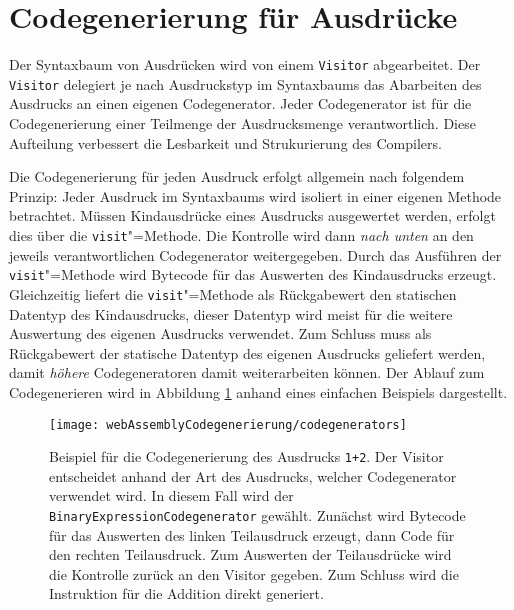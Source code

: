 \pagebreak


\section{Codegenerierung für Ausdrücke}
\label{sec:Codegenerierung-für-Ausdrücke}

Der Syntaxbaum von Ausdrücken wird von einem \lstinline{Visitor} abgearbeitet. Der \lstinline{Visitor} delegiert je nach Ausdruckstyp im Syntaxbaums das Abarbeiten des Ausdrucks an einen eigenen Codegenerator. Jeder Codegenerator ist für die Codegenerierung einer Teilmenge der Ausdrucksmenge verantwortlich. Diese Aufteilung verbessert die Lesbarkeit und Strukurierung des Compilers.

Die Codegenerierung für jeden Ausdruck erfolgt allgemein nach folgendem Prinzip: Jeder Ausdruck im Syntaxbaums wird isoliert in einer eigenen Methode betrachtet. Müssen Kindausdrücke eines Ausdrucks ausgewertet werden, erfolgt dies über die \lstinline{visit}"=Methode. Die Kontrolle wird dann \emph{nach unten} an den jeweils verantwortlichen Codegenerator weitergegeben. Durch das Ausführen der \lstinline{visit}"=Methode wird Bytecode für das Auswerten des Kindausdrucks erzeugt. Gleichzeitig liefert die \lstinline{visit}"=Methode als Rückgabewert den statischen Datentyp des Kindausdrucks, dieser Datentyp wird meist für die weitere Auswertung des eigenen Ausdrucks verwendet. Zum Schluss muss als Rückgabewert der statische Datentyp des eigenen Ausdrucks geliefert werden, damit \emph{höhere} Codegeneratoren damit weiterarbeiten können. Der Ablauf zum Codegenerieren wird in Abbildung \ref{fig:codegenerators} anhand eines einfachen Beispiels dargestellt.

\begin{figure}
    \centering
    \texttt{[image: webAssemblyCodegenerierung/codegenerators]}
    \caption{Beispiel für die Codegenerierung des Ausdrucks \lstinline{1+2}. Der Visitor entscheidet anhand der Art des Ausdrucks, welcher Codegenerator verwendet wird. In diesem Fall wird der \lstinline{BinaryExpressionCodegenerator} gewählt. Zunächst wird Bytecode für das Auswerten des linken Teilausdruck erzeugt, dann Code für den rechten Teilausdruck. Zum Auswerten der Teilausdrücke wird die Kontrolle zurück an den Visitor gegeben. Zum Schluss wird die Instruktion für die Addition direkt generiert.}
    \label{fig:codegenerators}
\end{figure}

